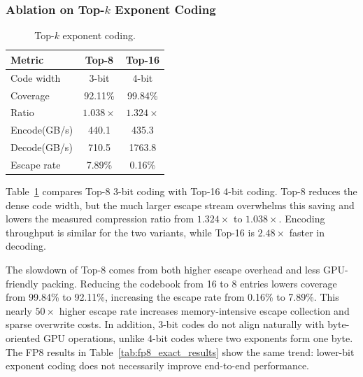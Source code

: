\subsubsection{Ablation on Top-$k$ Exponent Coding}
\label{sec:ablation_topk}

\begin{table}
    \vspace{-1.2em}
    \centering
    \caption{Top-$k$ exponent coding.}
    \label{tab:ablation_topk}
    \footnotesize
    \setlength{\tabcolsep}{4pt}
    \renewcommand{\arraystretch}{1.08}
    \begin{tabular}{lcc}
        \toprule
        \textbf{Metric} & \textbf{Top-8} & \textbf{Top-16} \\
        \midrule
        Code width & 3-bit & 4-bit \\
        Coverage & 92.11\% & 99.84\% \\
        Ratio & $1.038\times$ & $1.324\times$ \\
        Encode(GB/s) & 440.1 & 435.3 \\
        Decode(GB/s) & 710.5 & 1763.8 \\
        Escape rate & 7.89\% & 0.16\% \\
        \bottomrule
    \end{tabular}
    \vspace{-1.7em}
\end{table}

Table~\ref{tab:ablation_topk} compares Top-8 3-bit coding with Top-16 4-bit coding.
Top-8 reduces the dense code width, but the much larger escape stream overwhelms this saving and lowers the measured compression ratio from $1.324\times$ to $1.038\times$.
Encoding throughput is similar for the two variants, while Top-16 is $2.48\times$ faster in decoding.

The slowdown of Top-8 comes from both higher escape overhead and less GPU-friendly packing.
Reducing the codebook from 16 to 8 entries lowers coverage from 99.84\% to 92.11\%, increasing the escape rate from 0.16\% to 7.89\%.
This nearly $50\times$ higher escape rate increases memory-intensive escape collection and sparse overwrite costs.
In addition, 3-bit codes do not align naturally with byte-oriented GPU operations, unlike 4-bit codes where two exponents form one byte.
The FP8 results in Table~\ref{tab:fp8_exact_results} show the same trend: lower-bit exponent coding does not necessarily improve end-to-end performance.
